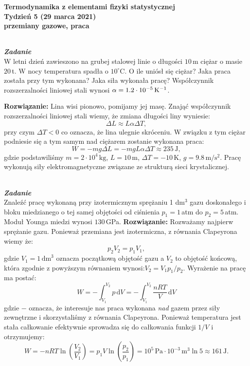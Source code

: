 \documentclass[11pt,a4paper]{article}
\newcounter{zadanie}\newcommand{\zadanie}[1][]{\addtocounter{zadanie}{1} ~\\  {\bf \emph{Zadanie \arabic{zadanie} #1 }} \\}
\renewcommand{\t}[1]{\textrm{#1}}
\begin{document}

\begin{centering}
\bf{\Large{Termodynamika z elementami fizyki statystycznej}}\\
Tydzień 5  (29 marca 2021)\\[3mm]
przemiany gazowe, praca \\
\end{centering}
\vspace{5mm}

\zadanie
W letni dzień zawieszono na grubej stalowej linie o długości $10\,$m ciężar o masie $20\,$t.
W nocy temperatura spadła o $10^\circ$C. O ile uniósł się ciężar?
Jaka praca została przy tym wykonana? Jaka siła wykonała pracę?
Współczynnik rozszerzalności liniowej stali wynosi $\alpha = 1.2\cdot 10^{-5}\,{\rm K}^{-1}$.
\vskip 10pt

\textbf{Rozwiązanie:}
Lina wisi pionowo, pomijamy jej masę. Znająć współczynnik rozszerzalności liniowej stali wiemy, że
zmiana długości liny wyniesie:
$$
\Delta L \approx L \alpha \Delta T,
$$
przy czym $\Delta T < 0$ co oznacza, że lina ulegnie skróceniu. W związku z tym ciężar podniesie się
a tym samym nad ciężarem zostanie wykonana praca:
$$
W = - mg \Delta L = - mg L \alpha \Delta T \approx 235\,\t{J},
$$
gdzie podstawiliśmy $m=2 \cdot 10^4\,\t{kg}$, $L = 10\,\t{m}$, $\Delta T = -10\,\t{K}$, $g=9.8\,\t{m}/\t{s}^2$.
Pracę wykonują siły elektromagnetyczne związane ze strukturą sieci krystalicznej.


\zadanie
Znaleźć pracę wykonaną przy izotermicznym sprężaniu 1 dm$^3$
gazu doskonałego i bloku miedzianego o tej samej objętości od
ciśnienia $p_1=1\,$atm do $p_2=5\,$atm. Moduł Younga miedzi wynosi $130\,$GPa.
\vskip 10pt
\textbf{Rozwiązanie:}
Rozważamy najpierw sprężanie gazu. Ponieważ przemiana jest izotermiczna, z równania Clapeyrona wiemy że:
$$
p_2 V_2 = p_1 V_1,
$$
gdzie $V_1=1\,\t{dm}^3$ oznacza początkową objętość gazu a $V_2$ to objętość końcową, która zgodnie z powyższym równaniem
wynosi:$V_2 =V_1 p_1/p_2$.
Wyrażenie na pracę ma postać:
$$
W = - \int_{V_1}^{V_2} p \,\t{d}V = - \int_{V_1}^{V_2} \frac{n R T}{V} \,\t{d}V
$$
gdzie $-$ oznacza, że interesuje nas praca wykonana \emph{nad} gazem przez siły zewnętrzne i skorzystaliśmy z równania Clapeyrona.
Ponieważ temperatura jest stała całkowanie efektywnie sprowadza się do całkowania funkcji $1/V$ i otrzymujemy:
$$
W = - n R T \ln\left(\frac{V_2}{V_1} \right) = p_1 V \ln\left(\frac{p_2}{p_1}\right) = 10^5\,\t{Pa}\cdot 10^{-3}\,\t{m}^3 \ln 5 \approx 161\, \t{J}.
$$
\end{document}
